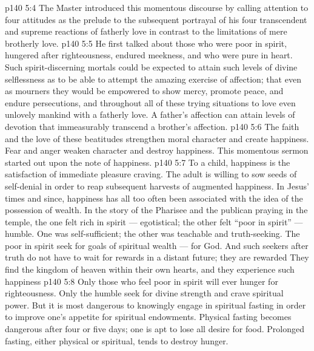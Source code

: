 \vs p140 5:4 \pc The Master introduced this momentous discourse by calling attention to four  attitudes as the prelude to the subsequent portrayal of his four transcendent and supreme reactions of fatherly love in contrast to the limitations of mere brotherly love.
\vs p140 5:5 He first talked about those who were poor in spirit, hungered after righteousness, endured meekness, and who were pure in heart. Such spirit\hyp{}discerning mortals could be expected to attain such levels of divine selflessness as to be able to attempt the amazing exercise of  affection; that even as mourners they would be empowered to show mercy, promote peace, and endure persecutions, and throughout all of these trying situations to love even unlovely mankind with a fatherly love. A father’s affection can attain levels of devotion that immeasurably transcend a brother’s affection.
\vs p140 5:6 The faith and the love of these beatitudes strengthen moral character and create happiness. Fear and anger weaken character and destroy happiness. This momentous sermon started out upon the note of happiness.
\vs p140 5:7 \pc {}\bibnobreakspace {} To a child, happiness is the satisfaction of immediate pleasure craving. The adult is willing to sow seeds of self\hyp{}denial in order to reap subsequent harvests of augmented happiness. In Jesus’ times and since, happiness has all too often been associated with the idea of the possession of wealth. In the story of the Pharisee and the publican praying in the temple, the one felt rich in spirit --- egotistical; the other felt “poor in spirit” --- humble. One was self\hyp{}sufficient; the other was teachable and truth\hyp{}seeking. The poor in spirit seek for goals of spiritual wealth --- for God. And such seekers after truth do not have to wait for rewards in a distant future; they are rewarded  They find the kingdom of heaven within their own hearts, and they experience such happiness 
\vs p140 5:8 \pc {}\bibnobreakspace {} Only those who feel poor in spirit will ever hunger for righteousness. Only the humble seek for divine strength and crave spiritual power. But it is most dangerous to knowingly engage in spiritual fasting in order to improve one’s appetite for spiritual endowments. Physical fasting becomes dangerous after four or five days; one is apt to lose all desire for food. Prolonged fasting, either physical or spiritual, tends to destroy hunger.
